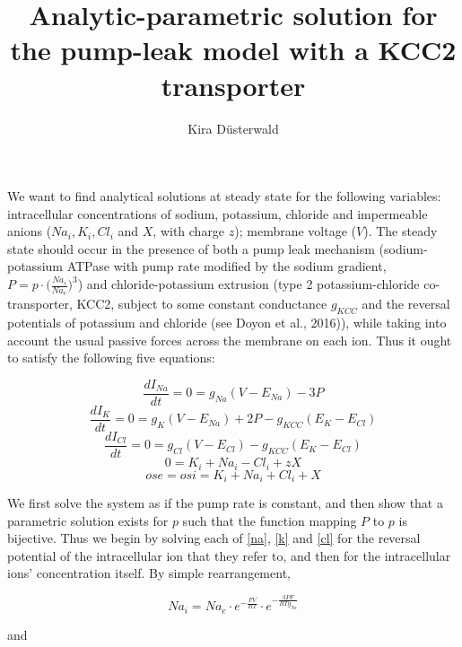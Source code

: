 \documentclass[a4paper,11pt]{article}
\title{Analytic-parametric solution for the pump-leak model with a KCC2 transporter}
\author{Kira D\"usterwald}
\begin{document}
\maketitle

We want to find analytical solutions at steady state for the following variables: intracellular concentrations of sodium, potassium, chloride and impermeable anions ($Na_i, K_i, Cl_i$ and $X$, with charge $z$); membrane voltage ($V$). The steady state should occur in the presence of both a pump leak mechanism (sodium-potassium ATPase with pump rate modified by the sodium gradient, $P=p\cdot\Big(\frac{Na_i}{Na_e}\Big)^3$) and chloride-potassium extrusion (type 2 potassium-chloride co-transporter, KCC2, subject to some constant conductance $g_{KCC}$ and the reversal potentials of potassium and chloride (see Doyon et al., 2016)), while taking into account the usual passive forces across the membrane on each ion. Thus it ought to satisfy the following five equations:

\begin{equation} \label{na}
\frac{dI_{Na}}{dt} =0= g_{Na}(V-E_{Na})-3P
\end{equation}
\begin{equation} \label{k}
\frac{dI_{K}}{dt} =0= g_K(V-E_{Na})+2P-g_{KCC}(E_K-E_{Cl})
\end{equation}
\begin{equation} \label{cl}
\frac{dI_{Cl}}{dt} =0= g_{Cl}(V-E_{Cl})-g_{KCC}(E_K-E_{Cl})
\end{equation}
\begin{equation} \label{in}
0=K_i+Na_i-Cl_i+zX
\end{equation}
\begin{equation} \label{osmo}
ose = osi=K_i+Na_i+Cl_i+X
\end{equation}

We first solve the system as if the pump rate is constant, and then show that a parametric solution exists for $p$ such that the function mapping $P$ to $p$ is bijective. Thus we begin by solving each of \eqref{na}, \eqref{k} and \eqref{cl} for the reversal potential of the intracellular ion that they refer to, and then for the intracellular ions' concentration itself. By simple rearrangement,

\begin{equation} \label{nai}
Na_i = Na_e \cdot e^{-\frac{FV}{RT}} \cdot e^{-\frac{3PF}{RTg_{Na}}} 
\end{equation}

and
\end{document}
